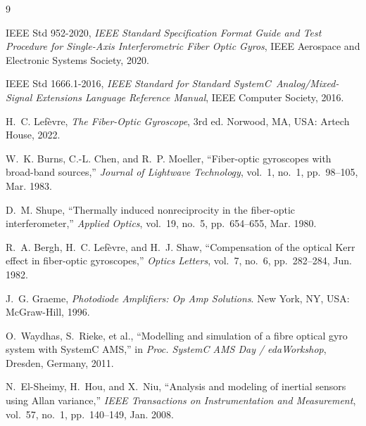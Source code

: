 \documentclass[11pt, a4paper]{article}
\begin{document}
\begin{thebibliography}{9}

IEEE Std 952-2020, \emph{IEEE Standard Specification Format Guide and Test Procedure for Single-Axis Interferometric Fiber Optic Gyros}, IEEE Aerospace and Electronic Systems Society, 2020.

IEEE Std 1666.1-2016, \emph{IEEE Standard for Standard SystemC\textregistered\ Analog/Mixed-Signal Extensions Language Reference Manual}, IEEE Computer Society, 2016.

H.~C. Lefèvre, \emph{The Fiber-Optic Gyroscope}, 3rd ed. Norwood, MA, USA: Artech House, 2022.

W.~K. Burns, C.-L. Chen, and R.~P. Moeller, ``Fiber-optic gyroscopes with broad-band sources,'' \emph{Journal of Lightwave Technology}, vol.~1, no.~1, pp.~98--105, Mar. 1983.

D.~M. Shupe, ``Thermally induced nonreciprocity in the fiber-optic interferometer,'' \emph{Applied Optics}, vol.~19, no.~5, pp.~654--655, Mar. 1980.

R.~A. Bergh, H.~C. Lefèvre, and H.~J. Shaw, ``Compensation of the optical Kerr effect in fiber-optic gyroscopes,'' \emph{Optics Letters}, vol.~7, no.~6, pp.~282--284, Jun. 1982.

J.~G. Graeme, \emph{Photodiode Amplifiers: Op Amp Solutions}. New York, NY, USA: McGraw-Hill, 1996.

O.~Waydhas, S.~Rieke, et al., ``Modelling and simulation of a fibre optical gyro system with SystemC AMS,'' in \emph{Proc. SystemC AMS Day / edaWorkshop}, Dresden, Germany, 2011.

N.~El-Sheimy, H.~Hou, and X.~Niu, ``Analysis and modeling of inertial sensors using Allan variance,'' \emph{IEEE Transactions on Instrumentation and Measurement}, vol.~57, no.~1, pp.~140--149, Jan. 2008.

\end{thebibliography}
\end{document}
